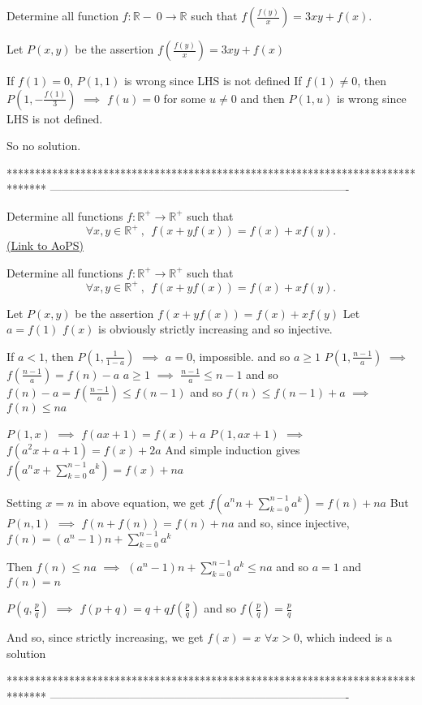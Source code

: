 \begin{solution}
	\begin{tcolorbox}Determine all function ${f: \mathbb{R}-\ 0}\to\mathbb{R}$ such that $f(\frac{f(y)}{x})=3xy+f(x)$.\end{tcolorbox}
Let $P(x,y)$ be the assertion $f(\frac{f(y)}{x})=3xy+f(x)$

If $f(1)=0$, $P(1,1)$ is wrong since LHS is not defined
If $f(1)\ne 0$, then $P(1,-\frac{f(1)}3)$ $\implies$ $f(u)=0$ for some $u\ne 0$ and then $P(1,u)$ is wrong since LHS is not defined.

So no solution.
\end{solution}
*******************************************************************************
-------------------------------------------------------------------------------

\begin{problem}
	Determine all functions $f : \mathbb{R}^+ \to \mathbb{R}^+$ such that \[ \forall x, y \in \mathbb{R}^+ \ , \  \  f(x+yf(x))=f(x)+xf(y).\]
	\flushright \href{https://artofproblemsolving.com/community/c6h611702}{(Link to AoPS)}
\end{problem}



\begin{solution}
	\begin{tcolorbox}Determine all functions $f : \mathbb{R}^+ \to \mathbb{R}^+$ such that \[ \forall x, y \in \mathbb{R}^+ \ , \  \  f(x+yf(x))=f(x)+xf(y).\]\end{tcolorbox}
Let $P(x,y)$ be the assertion $f(x+yf(x))=f(x)+xf(y)$
Let $a=f(1)$
$f(x)$ is obviously strictly increasing and so injective.

If $a<1$, then $P(1,\frac 1{1-a})$ $\implies$ $a=0$, impossible. and so $a\ge 1$
$P(1,\frac{n-1}a)$ $\implies$ $f(\frac{n-1}a)=f(n)-a$
$a\ge 1$ $\implies$  $\frac{n-1}a\le n-1$ and so $f(n)-a=f(\frac{n-1}a)\le f(n-1)$ and so $f(n)\le f(n-1)+a$ $\implies$ $f(n)\le na$

$P(1,x)$ $\implies$ $f(ax+1)=f(x)+a$
$P(1,ax+1)$ $\implies$ $f(a^2x+a+1)=f(x)+2a$
And simple induction gives $f(a^nx+\sum_{k=0}^{n-1}a^k)=f(x)+na$

Setting $x=n$ in above equation, we get $f(a^nn+\sum_{k=0}^{n-1}a^k)=f(n)+na$
But $P(n,1)$ $\implies$ $f(n+f(n))=f(n)+na$ and so, since injective, $f(n)=(a^n-1)n+\sum_{k=0}^{n-1}a^k$

Then $f(n)\le na$ $\implies$ $(a^n-1)n+\sum_{k=0}^{n-1}a^k\le na$ and so $a=1$ and $f(n)=n$

$P(q,\frac pq)$ $\implies$ $f(p+q)=q+qf(\frac pq)$ and so $f(\frac pq)=\frac pq$

And so, since strictly increasing, we get $\boxed{f(x)=x}$ $\forall x>0$, which indeed is a solution
\end{solution}
*******************************************************************************
-------------------------------------------------------------------------------

